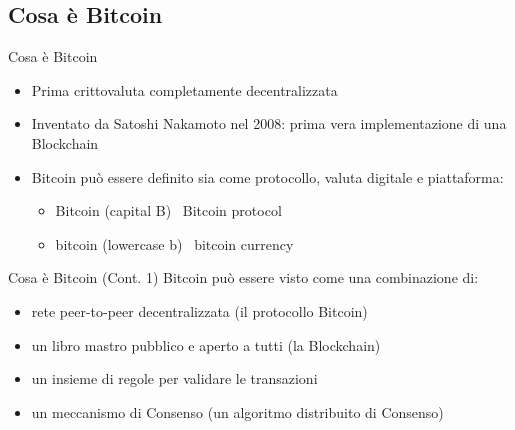 \documentclass{beamer}
\begin{document}
  \subsection{Cosa è Bitcoin}
  \begin{frame}{Cosa è Bitcoin}
    \begin{itemize}
      \item Prima crittovaluta completamente decentralizzata
      \item Inventato da Satoshi Nakamoto nel 2008: prima vera implementazione di una Blockchain
      \item Bitcoin può essere definito sia come protocollo, valuta digitale e piattaforma: 
      \begin{itemize}
        \item Bitcoin (capital B)  \MVRightarrow\, Bitcoin protocol
        \item bitcoin (lowercase b) \MVRightarrow\, bitcoin  currency
      \end{itemize} \pause
    \end{itemize}

  \end{frame}




  \begin{frame}{Cosa è Bitcoin (Cont. 1)}
    Bitcoin può essere visto come una combinazione di: 
    \begin{itemize}
      \item rete peer-to-peer decentralizzata (il protocollo Bitcoin)
      \item un libro mastro pubblico e aperto a tutti (la Blockchain) 
      \item un insieme di regole per validare le transazioni  
      \item un meccanismo di Consenso (un algoritmo distribuito di Consenso) 
    \end{itemize}
  \end{frame}
\end{document}
